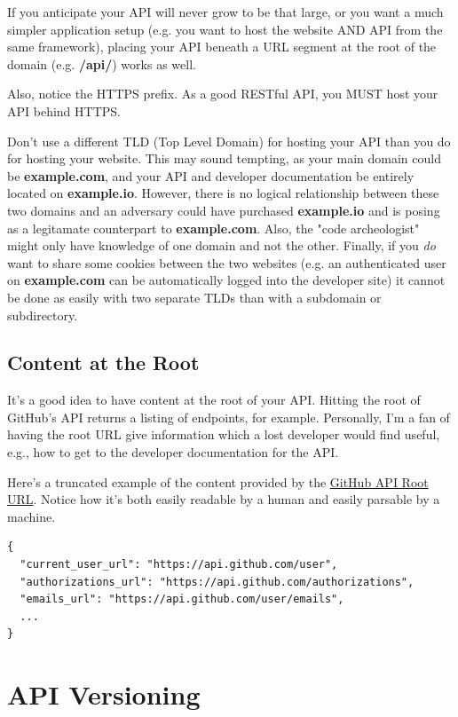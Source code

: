 \documentclass{book}
\begin{document}
If you anticipate your API will never grow to be that large, or you want a much simpler application setup (e.g. you want to host the website AND API from the same framework), placing your API beneath a URL segment at the root of the domain (e.g. \textbf{/api/}) works as well.

Also, notice the HTTPS prefix. As a good RESTful API, you MUST host your API behind HTTPS.

Don't use a different TLD (Top Level Domain) for hosting your API than you do for hosting your website. This may sound tempting, as your main domain could be \textbf{example.com}, and your API and developer documentation be entirely located on \textbf{example.io}. However, there is no logical relationship between these two domains and an adversary could have purchased \textbf{example.io} and is posing as a legitamate counterpart to \textbf{example.com}. Also, the "code archeologist" might only have knowledge of one domain and not the other. Finally, if you \emph{do} want to share some cookies between the two websites (e.g. an authenticated user on \textbf{example.com} can be automatically logged into the developer site) it cannot be done as easily with two separate TLDs than with a subdomain or subdirectory.

\section{Content at the Root}

It's a good idea to have content at the root of your API. Hitting the root of GitHub's API returns a listing of endpoints, for example. Personally, I'm a fan of having the root URL give information which a lost developer would find useful, e.g., how to get to the developer documentation for the API.

Here's a truncated example of the content provided by the \href{https://api.github.com/}{GitHub API Root URL}. Notice how it's both easily readable by a human and easily parsable by a machine.

\begin{verbatim}
{
  "current_user_url": "https://api.github.com/user",
  "authorizations_url": "https://api.github.com/authorizations",
  "emails_url": "https://api.github.com/user/emails",
  ...
}
\end{verbatim}


\chapter{API Versioning}
\end{document}
